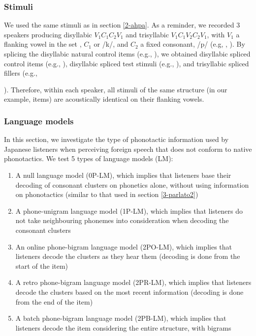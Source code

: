 \subsubsection{Stimuli}
We used the same stimuli as in section \ref{2-ahpa}. As a reminder, we recorded 3 speakers producing disyllabic $V_{1}C_{1}C_{2}V_{1}$ and trisyllabic $V_{1}C_{1}V_{2}C_{2}V_{1}$, with $V_{1}$ a flanking vowel in the set , $C_{1}$  or /k/, and $C_{2}$ a fixed consonant, /p/ (e.g, , ). By splicing the disyllabic natural control items (e.g., ), we obtained disyllabic spliced control items (e.g., \texorpdfstring{}{}), disyllabic spliced test stimuli (e.g., \texorpdfstring{}{}), and trisyllabic spliced fillers (e.g., {). Therefore, within each speaker, all stimuli of the same structure (in our example,  items) are acoustically identical on their flanking vowels.

\subsubsection{Language models}
In this section, we investigate the type of phonotactic information used by Japanese listeners when perceiving foreign speech that does not conform to native phonotactics. We test 5 types of language models (LM): 
\begin{enumerate}
    \item A null language model (0P-LM), which implies that listeners base their decoding of consonant clusters on phonetics alone, without using information on phonotactics (similar to that used in section \ref{3-parlato2})
    \item A phone-unigram language model (1P-LM), which implies that listeners do not take neighbouring phonemes into consideration when decoding the consonant clusters
    \item An online phone-bigram language model (2PO-LM), which implies that listeners decode the clusters as they hear them (decoding is done from the start of the item)
    \item A retro phone-bigram language model (2PR-LM), which implies that listeners decode the clusters based on the most recent information (decoding is done from the end of the item)
    \item A batch phone-bigram language model (2PB-LM), which implies that listeners decode the item considering the entire structure, with bigrams %
    \end{enumerate}

}
